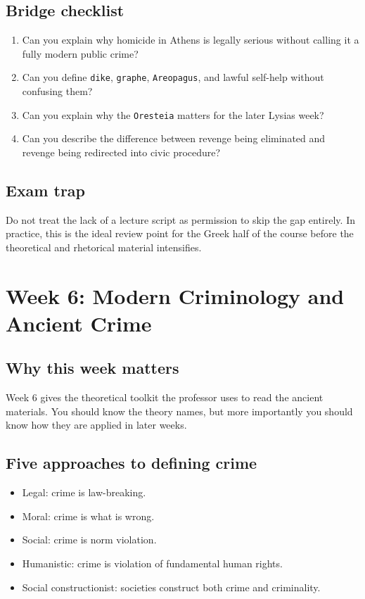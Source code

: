 \documentclass[11pt]{article}
\begin{document}
\subsection{Bridge checklist}

\begin{enumerate}
\item Can you explain why homicide in Athens is legally serious without calling it a fully modern public crime?
\item Can you define \texttt{dike}, \texttt{graphe}, \texttt{Areopagus}, and lawful self-help without confusing them?
\item Can you explain why the \texttt{Oresteia} matters for the later Lysias week?
\item Can you describe the difference between revenge being eliminated and revenge being redirected into civic procedure?
\end{enumerate}

\subsection{Exam trap}

Do not treat the lack of a lecture script as permission to skip the gap entirely. In practice, this is the ideal review point for the Greek half of the course before the theoretical and rhetorical material intensifies.

\section{Week 6: Modern Criminology and Ancient Crime}

\subsection{Why this week matters}

Week 6 gives the theoretical toolkit the professor uses to read the ancient materials. You should know the theory names, but more importantly you should know how they are applied in later weeks.

\subsection{Five approaches to defining crime}

\begin{itemize}
\item Legal: crime is law-breaking.
\item Moral: crime is what is wrong.
\item Social: crime is norm violation.
\item Humanistic: crime is violation of fundamental human rights.
\item Social constructionist: societies construct both crime and criminality.
\end{itemize}
\end{document}
